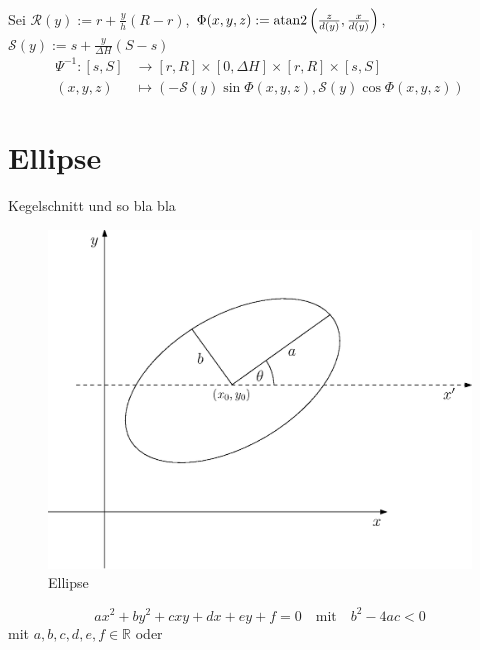 Sei $\mathcal{R}(y) := r + \frac{y}{h} (R - r)$, $\Phi(x,y,z) := \text{atan2}\left(\frac{z}{d(y)}, \frac{x}{d(y)}\right)$, $\mathcal{S}(y) := s + \frac{y}{\Delta H} (S-s)$
\begin{equation}
\begin{aligned}
\Psi^{-1} \colon  [s,S] &\to [r,R] \times [0, \Delta H] \times [r,R]\times [s,S]\\
(x,y,z) &\mapsto \left(-\mathcal{S}(y)\sin \Phi(x,y,z), \mathcal{S}(y)\cos\Phi(x,y,z)\right) 
\end{aligned}
\end{equation}




\section{Ellipse}

\begin{definition}[Ellipse]
	Kegelschnitt und so bla bla
\end{definition}

\begin{figure}[!htb]
	\centering
	\includegraphics[scale=.7]{images/ellipse.eps}
	\caption{Ellipse}
	\label{fig:ellipse}
\end{figure}

\begin{equation} 
ax^2 + by^2 + cxy + dx + ey + f = 0 \quad \text{mit}\quad b^2-4ac < 0
\end{equation} 
mit $a,b,c,d,e,f \in \mathbb{R}$ oder

